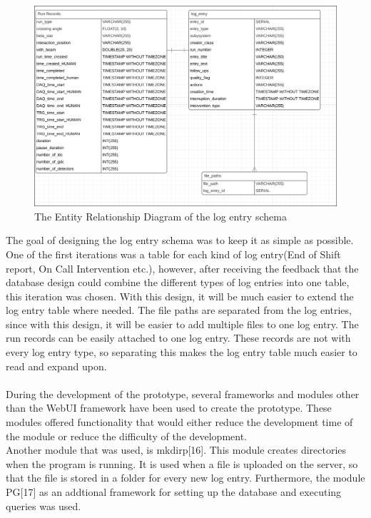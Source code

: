 \documentclass[paper=a4, fontsize=11pt,twoside]{scrartcl}	%
\begin{document}
\begin{figure}[H]
\includegraphics[scale=0.4]{erd_log_entry}
\caption{The Entity Relationship Diagram of the log entry schema}
\end{figure}
\noindent
The goal of designing the log entry schema was to keep it as simple as possible. One of the first iterations was a table for each kind of log entry(End of Shift report, On Call Intervention etc.), however, after receiving the feedback that the database design could combine the different types of log entries into one table, this iteration was chosen. With this design, it will be much easier to extend the log entry table where needed. The file paths are separated from the log entries, since with this design, it will be easier to add multiple files to one log entry. The run records can be easily attached to one log entry. These records are not with every log entry type, so separating this makes the log entry table much easier to read and expand upon. \\ \\
During the development of the prototype, several frameworks and modules other than the WebUI framework have been used to create the prototype. These modules offered functionality that would either reduce the development time of the module or reduce the difficulty of the development. \\
Another module that was used, is mkdirp[16]. This module creates directories when the program is running. It is used when a file is uploaded on the server, so that the file is stored in a folder for every new log entry. Furthermore, the module PG[17] as an addtional framework for setting up the database and executing queries was used. 
\end{document}
